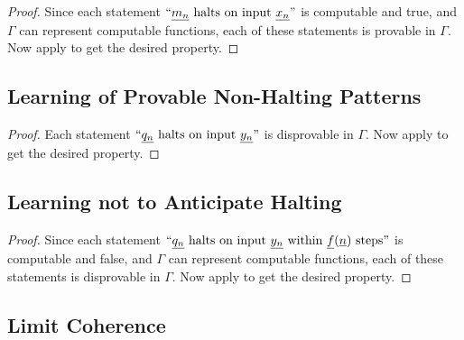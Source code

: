 \documentclass[authordate,onecolumn,noenvironments]{miri-tech-article}
\numberwithin{equation}{subsection}
\newcommand{\quot}[1]{``#1"}
\newcommand{\enc}[1]{{\underline{#1}}}
\newcommand{\nn}{n}
\newcommand{\representscomputations}{can represent computable functions}
\newcommand{\Theory}{\Gamma}
\begin{document}
\restatehalts*

\begin{proof}
  Since each statement $\quot{\text{$\enc{m_\nn}$ halts on input $\enc{x_\nn}$}}$ is computable and true, and $\Theory$ \representscomputations, each of these statements is provable in $\Theory$.  Now apply  to get the desired property.
\end{proof}

\subsection{Learning of Provable Non-Halting Patterns}\label{app:loops}

\restateloops*

\begin{proof}
  Each statement $\quot{\text{$\enc{q_\nn}$ halts on input $\enc{y_\nn}$}}$ is disprovable in $\Theory$.  Now apply  to get the desired property.
\end{proof}

\subsection{Learning not to Anticipate Halting}\label{app:dontwait}

\restatedontwait*

\begin{proof}
  Since each statement $\quot{\text{$\enc{q_\nn}$ halts on input $\enc{y_\nn}$ within $\enc{f}(\enc{\nn})$ steps}}$ is computable and false, and $\Theory$ \representscomputations, each of these statements is disprovable in $\Theory$.  Now apply  to get the desired property.
\end{proof}

\subsection{Limit Coherence}\label{app:lc}

\limitcoherence*
\end{document}
